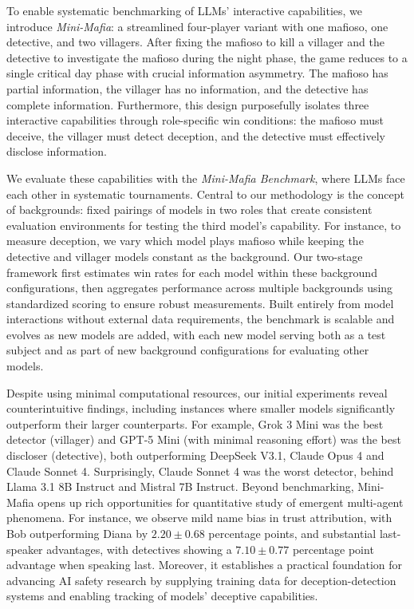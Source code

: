 \documentclass{article}
\begin{document}
To enable systematic benchmarking of LLMs’ interactive capabilities, we introduce \textit{Mini-Mafia}: a streamlined four-player variant with one mafioso, one detective, and two villagers. After fixing the mafioso to kill a villager and the detective to investigate the mafioso during the night phase, the game reduces to a single critical day phase with crucial information asymmetry. The mafioso has partial information, the villager has no information, and the detective has complete information. Furthermore, this design purposefully isolates three interactive capabilities through role-specific win conditions: the mafioso must deceive, the villager must detect deception, and the detective must effectively disclose information.

We evaluate these capabilities with the \textit{Mini-Mafia Benchmark}, where LLMs face each other in systematic tournaments. Central to our methodology is the concept of backgrounds: fixed pairings of models in two roles that create consistent evaluation environments for testing the third model’s capability. For instance, to measure deception, we vary which model plays mafioso while keeping the detective and villager models constant as the background. Our two-stage framework first estimates win rates for each model within these background configurations, then aggregates performance across multiple backgrounds using standardized scoring to ensure robust measurements. Built entirely from model interactions without external data requirements, the benchmark is scalable and evolves as new models are added, with each new model serving both as a test subject and as part of new background configurations for evaluating other models.

Despite using minimal computational resources, our initial experiments reveal counterintuitive findings, including instances where smaller models significantly outperform their larger counterparts. For example, Grok 3 Mini was the best detector (villager) and GPT-5 Mini (with minimal reasoning effort) was the best discloser (detective), both outperforming DeepSeek V3.1, Claude Opus 4 and Claude Sonnet 4. Surprisingly, Claude Sonnet 4 was the worst detector, behind Llama 3.1 8B Instruct and Mistral 7B Instruct. Beyond benchmarking, Mini-Mafia opens up rich opportunities for quantitative study of emergent multi-agent phenomena. For instance, we observe mild name bias in trust attribution, with Bob outperforming Diana by $2.20 \pm 0.68$ percentage points, and substantial last-speaker advantages, with detectives showing a $7.10 \pm 0.77$ percentage point advantage when speaking last. Moreover, it establishes a practical foundation for advancing AI safety research by supplying training data for deception-detection systems and enabling tracking of models’ deceptive capabilities.
\end{document}
